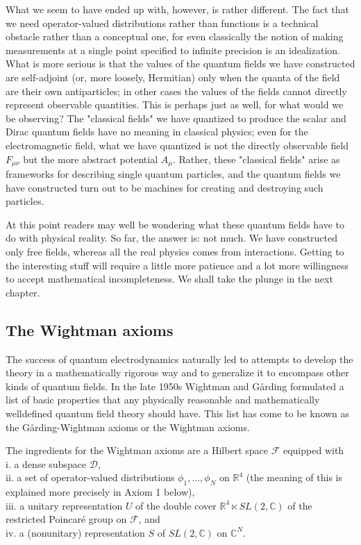 \documentclass[10pt, letterpaper]{article}
\begin{document}
What we seem to have ended up with, however, is rather different. The fact that we need operator-valued distributions rather than functions is a technical obstacle rather than a conceptual one, for even classically the notion of making measurements at a single point specified to infinite precision is an idealization. What is more serious is that the values of the quantum fields we have constructed are self-adjoint (or, more loosely, Hermitian) only when the quanta of the field are their own antiparticles; in other cases the values of the fields cannot directly represent observable quantities. This is perhaps just as well, for what would we be observing? The "classical fields" we have quantized to produce the scalar and Dirac quantum fields have no meaning in classical physics; even for the electromagnetic field, what we have quantized is not the directly observable field $F_{\mu \nu}$ but the more abstract potential $A_{\mu}$. Rather, these "classical fields" arise as frameworks for describing single quantum particles, and the quantum fields we have constructed turn out to be machines for creating and destroying such particles.

At this point readers may well be wondering what these quantum fields have to do with physical reality. So far, the answer is: not much. We have constructed only free fields, whereas all the real physics comes from interactions. Getting to the interesting stuff will require a little more patience and a lot more willingness to accept mathematical incompleteness. We shall take the plunge in the next chapter.

\subsection*{The Wightman axioms}
The success of quantum electrodynamics naturally led to attempts to develop the theory in a mathematically rigorous way and to generalize it to encompass other kinds of quantum fields. In the late 1950s Wightman and Gårding formulated a list of basic properties that any physically reasonable and mathematically welldefined quantum field theory should have. This list has come to be known as the Gårding-Wightman axioms or the Wightman axioms.

The ingredients for the Wightman axioms are a Hilbert space $\mathcal{F}$ equipped with\\
i. a dense subspace $\mathcal{D}$,\\
ii. a set of operator-valued distributions $\phi_{1}, \ldots, \phi_{N}$ on $\mathbb{R}^{4}$ (the meaning of this is explained more precisely in Axiom 1 below),\\
iii. a unitary representation $U$ of the double cover $\mathbb{R}^{4} \ltimes S L(2, \mathbb{C})$ of the restricted Poincaré group on $\mathcal{F}$, and\\
iv. a (nonunitary) representation $S$ of $S L(2, \mathbb{C})$ on $\mathbb{C}^{N}$.
\end{document}
